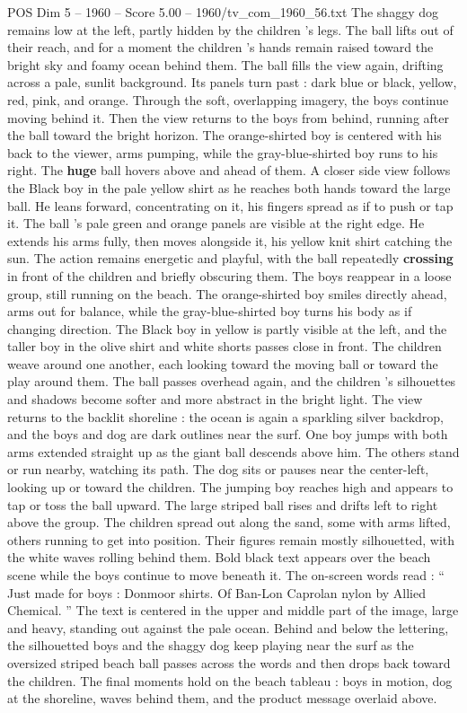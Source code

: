 \begin{textsample}{POS Dim 5 – 1960 – Score 5.00 – 1960/tv\_com\_1960\_56.txt}
The shaggy dog remains low at the left, partly hidden by the children ’s legs.
The ball lifts out of their reach, and for a moment the children ’s hands remain raised toward the bright sky and foamy ocean behind them.
The ball fills the view again, drifting across a pale, sunlit background.
Its panels turn past : dark blue or black, yellow, red, pink, and orange.
Through the soft, overlapping imagery, the boys continue moving behind it.
Then the view returns to the boys from behind, running after the ball toward the bright horizon.
The orange-shirted boy is centered with his back to the viewer, arms pumping, while the gray-blue-shirted boy runs to his right.
The \textbf{huge} ball hovers above and ahead of them.
A closer side view follows the Black boy in the pale yellow shirt as he reaches both hands toward the large ball.
He leans forward, concentrating on it, his fingers spread as if to push or tap it.
The ball ’s pale green and orange panels are visible at the right edge.
He extends his arms fully, then moves alongside it, his yellow knit shirt catching the sun.
The action remains energetic and playful, with the ball repeatedly \textbf{crossing} in front of the children and briefly obscuring them.
The boys reappear in a loose group, still running on the beach.
The orange-shirted boy smiles directly ahead, arms out for balance, while the gray-blue-shirted boy turns his body as if changing direction.
The Black boy in yellow is partly visible at the left, and the taller boy in the olive shirt and white shorts passes close in front.
The children weave around one another, each looking toward the moving ball or toward the play around them.
The ball passes overhead again, and the children ’s silhouettes and shadows become softer and more abstract in the bright light.
The view returns to the backlit shoreline : the ocean is again a sparkling silver backdrop, and the boys and dog are dark outlines near the surf.
One boy jumps with both arms extended straight up as the giant ball descends above him.
The others stand or run nearby, watching its path.
The dog sits or pauses near the center-left, looking up or toward the children.
The jumping boy reaches high and appears to tap or toss the ball upward.
The large striped ball rises and drifts left to right above the group.
The children spread out along the sand, some with arms lifted, others running to get into position.
Their figures remain mostly silhouetted, with the white waves rolling behind them.
Bold black text appears over the beach scene while the boys continue to move beneath it.
The on-screen words read : “ Just made for boys : Donmoor shirts.
Of Ban-Lon Caprolan nylon by Allied Chemical. ” The text is centered in the upper and middle part of the image, large and heavy, standing out against the pale ocean.
Behind and below the lettering, the silhouetted boys and the shaggy dog keep playing near the surf as the oversized striped beach ball passes across the words and then drops back toward the children.
The final moments hold on the beach tableau : boys in motion, dog at the shoreline, waves behind them, and the product message overlaid above.

\end{textsample}
